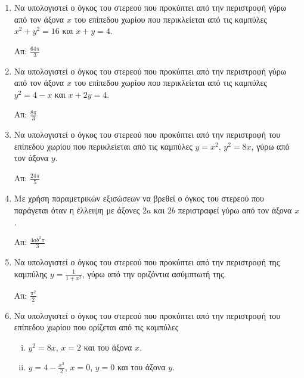 


\everymath{\displaystyle}
\thispagestyle{askhseis}



\begin{center}
  \minibox{\large\bfseries \textcolor{Col1}{Όγκος από περιστροφή}}
\end{center}

\vspace{\baselineskip}


\begin{enumerate}

\item Να υπολογιστεί ο όγκος του στερεού που προκύπτει από την περιστροφή γύρω
	από τον άξονα $x$ του επίπεδου χωρίου που περικλείεται από τις καμπύλες 
$ x^{2} + y^{2} = 16 $ και $ x+y=4 $.

\hfill Απ: $ \frac{64 \pi}{3} $

\item Να υπολογιστεί ο όγκος του στερεού που προκύπτει από την περιστροφή γύρω
	από τον άξονα $x$ του επίπεδου χωρίου που περικλείεται από τις καμπύλες 
$ y^{2} = 4-x $ και $ x+2y=4 $.

\hfill Απ: $ \frac{8 \pi}{3} $

\item Να υπολογιστεί ο όγκος του στερεού που προκύπτει από την περιστροφή του
	επίπεδου χωρίου που περικλείεται από τις καμπύλες $ y=x^{2} $, $ y^{2}=8x $,
	γύρω από τον άξονα $y$.

	\hfill Απ: $ \frac{24 \pi}{5} $

\item Με χρήση παραμετρικών εξισώσεων να βρεθεί ο όγκος του στερεού που παράγεται όταν η
	έλλειψη με άξονες $2a$ και $2b$ περιστραφεί γύρω από τον άξονα $x$.

	\hfill Απ: $ \frac{4ab^{2} \pi}{3} $
	
\item Να υπολογιστεί ο όγκος του στερεού που προκύπτει από την περιστροφή της καμπύλης 
    $ y = \frac{1}{1 + x^{2}} $, γύρω από την οριζόντια ασύμπτωτή της.

    \hfill Απ: $ \frac{\pi ^{2}}{2} $ 


\item Να υπολογιστεί ο όγκος του στερεού που προκύπτει από την περιστροφή του
	επίπεδου χωρίου που ορίζεται από τις καμπύλες 
	\begin{enumerate}[i)]
	\item 	$ y^{2} = 8x $, $ x=2 $ και	του άξονα $x$.
	\item $ y = 4 - \frac{x^{3}}{2} $, $ x=0 $, $ y=0 $ και του άξονα $y$.
	\end{enumerate}


\end{enumerate}
